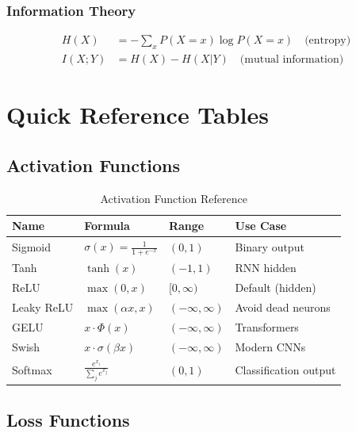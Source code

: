 \subsection{Information Theory}

\begin{align}
H(X) &= -\sum_x P(X=x)\log P(X=x) \quad \text{(entropy)} \\
I(X; Y) &= H(X) - H(X|Y) \quad \text{(mutual information)}
\end{align}

\chapter{Quick Reference Tables}

\section{Activation Functions}

\begin{table}[ht]
    \centering
    \caption{Activation Function Reference}
    \begin{tabular}{L{2cm} L{4cm} L{3cm} L{3cm}}
        \toprule
        \textbf{Name} & \textbf{Formula} & \textbf{Range} & \textbf{Use Case} \\
        \midrule
        Sigmoid & $\sigma(x) = \frac{1}{1+e^{-x}}$ & $(0, 1)$ & Binary output \\
        Tanh & $\tanh(x)$ & $(-1, 1)$ & RNN hidden \\
        ReLU & $\max(0, x)$ & $[0, \infty)$ & Default (hidden) \\
        Leaky ReLU & $\max(\alpha x, x)$ & $(-\infty, \infty)$ & Avoid dead neurons \\
        GELU & $x\cdot\Phi(x)$ & $(-\infty, \infty)$ & Transformers \\
        Swish & $x \cdot \sigma(\beta x)$ & $(-\infty, \infty)$ & Modern CNNs \\
        Softmax & $\frac{e^{x_i}}{\sum_j e^{x_j}}$ & $(0, 1)$ & Classification output \\
        \bottomrule
    \end{tabular}
\end{table}

\section{Loss Functions}

